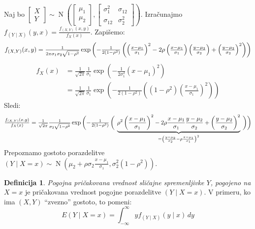 \documentclass[12pt]{book}
\theoremstyle{definition}
\newtheorem{definicija}{Definicija}
\theoremstyle{plain}
\theoremstyle{plain}
\theoremstyle{plain}
\theoremstyle{remark}
\begin{document}
\begin{zgled} 
    Naj bo $\begin{bmatrix}X \\ Y \end{bmatrix} \sim \operatorname{N}\left(\begin{bmatrix} \mu_1 \\\mu_2 \end{bmatrix}, \begin{bmatrix} \sigma_1^2 & \sigma_{12} \\ \sigma_{12} & \sigma_2^2\end{bmatrix}\right)$. \hspace{-2.82718pt}Izračunajmo $f_{(Y \mid X)}(y, x)=\frac{f_{(X, Y)}(x, y)}{f_X(x)}$. Zapišemo:
    $$
    \scalebox{1}{$f_{(X, Y)}(x, y)=\frac{1}{2 \pi \sigma_1 \sigma_2 \sqrt{1-\rho^2}} \exp \left(-\frac{1}{2\left(1-\rho^2\right)}\left(\left(\frac{x-\mu_1}{\sigma_1}\right)^2-2 \rho\left(\frac{x-\mu_1}{\sigma_1}\right)\left(\frac{y-\mu_2}{\sigma_2}\right)+\left(\frac{y-\mu_2}{\sigma_2}\right)^2\right)\right)$}
    $$
    $$
    \begin{aligned}
        f_X(x)&=\frac{1}{\sqrt{2 \pi}} \frac{1}{\sigma_1} \exp\left(-\frac{1}{2 \sigma_1^2}\left(x-\mu_1\right)^2\right) \\
        &=\frac{1}{\sqrt{2 \pi}} \frac{1}{\sigma_1} \exp\left(-\frac{1}{2\left(1-\rho^2\right)}\left(\left(1-\rho^2\right)\left(\frac{x-\mu_1}{\sigma_1}\right)^2\right)\right)    
    \end{aligned}
    $$
    Sledi:
    $$
    \scalebox{0.9}{$\frac{f_{(X, Y)}(x, y)}{f_X(x)}=\frac{1}{\sqrt{2 \pi}} \frac{1}{\sigma_2 \sqrt{1-\rho^2}} \exp\left({-\frac{1}{2\left(1-\rho^2\right)}}\left( \vphantom{\rho^2\left(\frac{x-\mu_1}{\sigma_1}\right)^2}\right. \right. \underbrace{\rho^2\left(\frac{x-\mu_1}{\sigma_1}\right)^2-2 \rho \frac{x-\mu_1}{\sigma_1} \frac{y-\mu_2}{\sigma_2}+\left(\frac{y-\mu_2}{\sigma_2}\right)^2}_{=\left(\frac{y-\mu_2}{\sigma_2}-\rho \frac{x-\mu_1}{\sigma_1}\right)^2} \left. \left. \vphantom{\rho^2\left(\frac{x-\mu_1}{\sigma_1}\right)^2} \right)\right)$}
    $$
    Prepoznamo gostoto porazdelitve $ (Y \mid X=x) \sim \operatorname{N}\left(\mu_2+\rho \sigma_2 \frac{x-\mu_1}{\sigma_1}, \sigma_2^2\left(1-\rho^2\right)\right)$.
\end{zgled}

\begin{definicija}
    \emph{Pogojna pričakovana vrednost sličajne spremenljivke $Y$, pogojeno na $X=x$} je pričakovana vrednost pogojne porazdelitve $(Y \mid X=x)$. V primeru, ko ima $(X,Y)$ “zvezno” gostoto, to pomeni:
    $$
    E(Y \mid X=x)=\int_{-\infty}^{\infty} y f_{(Y \mid X)}(y \mid x)\, d y
    $$
\end{definicija}
\end{document}
